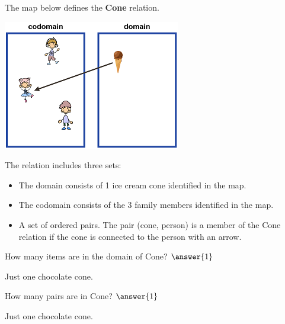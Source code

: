 \documentclass{ximera}
\begin{document}
\begin{definition}
  The map below defines the \textbf{Cone} relation. 
  
  

    \includegraphics[width=292px,height=214px]{pics/r26.png}

  
 

  The  relation includes three sets:
    \begin{itemize}
    \item The domain consists of 1 ice cream cone identified in the map.
    \item The codomain consists of the 3 family members identified in the map.
    \item A set of ordered pairs. The pair (cone, person) is a member of the Cone relation if the cone is connected to the person with an arrow.
    \end{itemize}

  
  
\end{definition}






\begin{exercise}
How many items are in the domain of Cone? $\answer{1}$
  \begin{feedback}
Just one chocolate cone.
  \end{feedback}
\end{exercise}




\begin{exercise}
How many pairs are in Cone? $\answer{1}$
  \begin{feedback}
Just one chocolate cone.
  \end{feedback}
\end{exercise}
\end{document}
